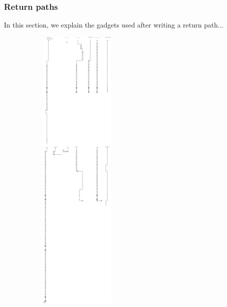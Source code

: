 \subsubsection{Return paths}
In this section, we explain the gadgets used after writing a return path...
\begin{figure}[H]
    \centering
    \begin{subfigure}[t]{0.9\textwidth}
        \centering
        \includegraphics[width=0.4\textwidth]{return_from_read_next}
        \caption{\label{fig:return_from_read_next}}
    \end{subfigure}%
\end{figure}